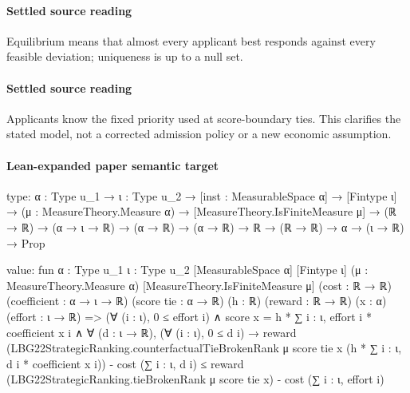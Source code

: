 \documentclass[10pt]{article}
\begin{document}
\begin{ReviewVerbatim}
\begin{definition} [Equilibrium]
{{	}
	}
\end{definition}
\end{ReviewVerbatim}

\paragraph{Settled source reading}
\begin{sloppypar}
Equilibrium means that almost every applicant best responds against every feasible deviation;\allowbreak{} uniqueness is up to a null set.\allowbreak{}
\end{sloppypar}
\paragraph{Settled source reading}
\begin{sloppypar}
Applicants know the fixed priority used at score-\allowbreak{}boundary ties.\allowbreak{} This clarifies the stated model, not a corrected admission policy or a new economic assumption.\allowbreak{}
\end{sloppypar}

\paragraph{Lean-expanded paper semantic target}
\begin{ReviewVerbatim}
type:
{α : Type u_1} →
  {ι : Type u_2} →
    [inst : MeasurableSpace α] →
      [Fintype ι] →
        (μ : MeasureTheory.Measure α) →
          [MeasureTheory.IsFiniteMeasure μ] →
            (ℝ → ℝ) → (α → ι → ℝ) → (α → ℝ) → (α → ℝ) → ℝ → (ℝ → ℝ) → α → (ι → ℝ) → Prop

value:
fun {α : Type u_1} {ι : Type u_2} [MeasurableSpace α] [Fintype ι] (μ : MeasureTheory.Measure α)
    [MeasureTheory.IsFiniteMeasure μ] (cost : ℝ → ℝ) (coefficient : α → ι → ℝ) (score tie : α → ℝ) (h : ℝ)
    (reward : ℝ → ℝ) (x : α) (effort : ι → ℝ) =>
  (∀ (i : ι), 0 ≤ effort i) ∧
    score x = h * ∑ i : ι, effort i * coefficient x i ∧
      ∀ (d : ι → ℝ),
        (∀ (i : ι), 0 ≤ d i) →
          reward
                (LBG22StrategicRanking.counterfactualTieBrokenRank μ score tie x (h * ∑ i : ι, d i * coefficient x i)) -
              cost (∑ i : ι, d i) ≤
            reward (LBG22StrategicRanking.tieBrokenRank μ score tie x) - cost (∑ i : ι, effort i)
\end{ReviewVerbatim}
\end{document}
